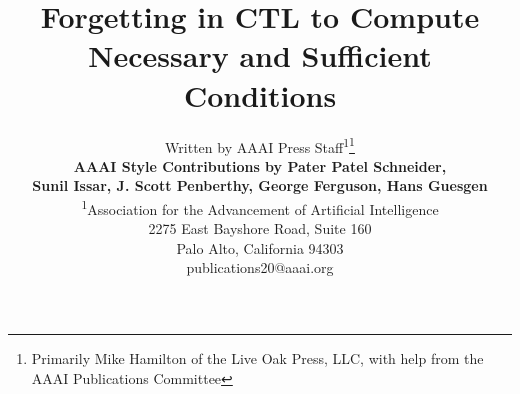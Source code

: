 \documentclass[letterpaper]{article} %
\title{Forgetting in CTL to Compute Necessary and Sufficient Conditions }
\author{Written by AAAI Press Staff\textsuperscript{\rm 1}\thanks{Primarily Mike Hamilton of the Live Oak Press, LLC, with help from the AAAI Publications Committee}\\ \Large \textbf{AAAI Style Contributions by
Pater Patel Schneider,} \\ \Large \textbf{Sunil Issar, J. Scott Penberthy, George Ferguson, Hans Guesgen}\\ %
\textsuperscript{\rm 1}Association for the Advancement of Artificial Intelligence\\ %
2275 East Bayshore Road, Suite 160\\
Palo Alto, California 94303\\
publications20@aaai.org %
}
\begin{document}
\newcommand{\tuple}[1]{{\langle{#1}\rangle}}
\newcommand{\Mod}{\textit{Mod}}
\newcommand\ie{{\it i.e. }}
\newcommand\eg{{\it e.g.}}
\newcommand\st{{\it s.t. }}
\newtheorem{definition}{Definition}
\newtheorem{examp}{Example}
\newenvironment{example}{\begin{examp}\rm}{\end{examp}}
\newtheorem{lemma}{Lemma}
\newtheorem{proposition}{Proposition}
\newtheorem{theorem}{Theorem}
\newtheorem{corollary}[theorem]{Corollary}
\newenvironment{proof}{{\bf Proof:}}{\hfill\rule{2mm}{2mm}\\ }
\newcommand{\rto}{\rightarrow}
\newcommand{\lto}{\leftarrow}
\newcommand{\lrto}{\leftrightarrow}
\newcommand{\Rto}{\Rightarrow}
\newcommand{\Lto}{\Leftarrow}
\newcommand{\LRto}{\Leftrightarrow}
\newcommand{\Var}{\textit{Var}}
\newcommand{\Forget}{\textit{Forget}}
\newcommand{\KForget}{\textit{KForget}}
\newcommand{\TForget}{\textit{TForget}}
\newcommand{\Fst}{\textit{Fst}}
\newcommand{\dep}{\textit{dep}}
\newcommand{\term}{\textit{term}}
\newcommand{\literal}{\textit{literal}}

\newcommand{\Atom}{\mathcal{A}}
\newcommand{\SFive}{\textbf{S5}}
\newcommand{\MPK}{\textsc{k}}
\newcommand{\MPB}{\textsc{b}}
\newcommand{\MPT}{\textsc{t}}
\newcommand{\MPA}{\forall}
\newcommand{\MPE}{\exists}

\newcommand{\DNF}{\textit{DNF}}
\newcommand{\CNF}{\textit{CNF}}

\newcommand{\degree}{\textit{degree}}
\newcommand{\sunfold}{\textit{sunfold}}

\newcommand{\Pos}{\textit{Pos}}
\newcommand{\Neg}{\textit{Neg}}
\newcommand\wrt{{\it w.r.t.}}
\newcommand{\Hm} {{\cal M}}
\newcommand{\Hw} {{\cal W}}
\newcommand{\Hr} {{\cal R}}
\newcommand{\Hb} {{\cal B}}
\newcommand{\Ha} {{\cal A}}

\newcommand{\Dsj}{\triangledown}

\newcommand{\wnext}{\widetilde{\bigcirc}}
\newcommand{\nex}{\bigcirc}
\newcommand{\ness}{\square}
\newcommand{\qness}{\boxminus}
\newcommand{\wqnext}{\widetilde{\circleddash}}
\newcommand{\qnext}{\circleddash}
\newcommand{\may}{\lozenge}
\newcommand{\qmay}{\blacklozenge}
\newcommand{\unt} {{\cal U}}
\newcommand{\since} {{\cal S}}
\newcommand{\SNF} {\textit{SNF$_C$}}
\newcommand{\start}{\textbf{start}}
\newcommand{\Elm}{\textit{Elm}}
\newcommand{\simp}{\textbf{simp}}
\newcommand{\nnf}{\textbf{nnf}}

\newcommand{\CTL}{\textrm{CTL}}
\newcommand{\Ind}{\textrm{Ind}}
\newcommand{\Tran}{\textrm{Tran}}
\newcommand{\Sub}{\textrm{Sub}}
\newcommand{\NI}{\textrm{NI}}
\newcommand{\Inst}{\textrm{Inst}}
\newcommand{\Com}{\textrm{Com}}
\newcommand{\Rp}{\textrm{Rp}}
\newcommand{\forget}{{\textsc{f}_\CTL}}
\newcommand{\ALL}{\textsc{a}}
\newcommand{\EXIST}{\textsc{e}}
\newcommand{\NEXT}{\textsc{x}}
\newcommand{\FUTURE}{\textsc{f}}
\newcommand{\UNTIL}{\textsc{u}}
\newcommand{\GLOBAL}{\textsc{g}}
\newcommand{\UNLESS}{\textsc{w}}
\newcommand{\Def}{\textrm{def}}
\newcommand{\IR}{\textrm{IR}}
\newcommand{\Tr}{\textrm{Tr}}
\newcommand{\dis}{\textrm{dis}}
\def\PP{\ensuremath{\textbf{PP}}}
\def\NgP{\ensuremath{\textbf{NP}}}
\def\W{\ensuremath{\textbf{W}}}
\newcommand{\Pre}{\textrm{Pre}}
\newcommand{\Post}{\textrm{Post}}
\end{document}
